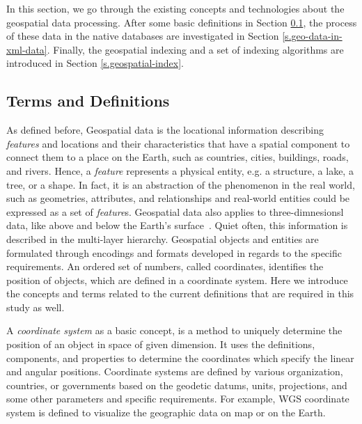\documentclass[a4paper,12pt]{article}
\begin{document}
In this section, we go through the existing concepts and technologies about the geospatial data processing. After some basic definitions in Section \ref{termsanddef}, the process of these data in the native databases are investigated in Section \ref{s.geo-data-in-xml-data}.
Finally, the geospatial indexing and a set of indexing algorithms are introduced in Section \ref{s.geospatial-index}.


\subsection{Terms and Definitions}
\label{termsanddef}
As defined before, Geospatial data is the locational information describing \textit{features} and locations and their characteristics that have a spatial component to connect them to a place on the Earth, such as countries, cities, buildings, roads, and rivers. Hence, a \textit{feature} represents a physical entity, e.g. a structure, a lake, a tree, or a shape. In fact, it is an abstraction of the phenomenon in the real world, such as geometries, attributes, and relationships and real-world entities could be expressed as a set of \textit{feature}s.
Geospatial data also applies to three-dimnesionsl data, like above and below the Earth's surface~\cite{powell}. Quiet often, this information is described in the multi-layer hierarchy. Geospatial objects and entities are formulated through encodings and formats developed in regards to the specific requirements. An ordered set of numbers, called coordinates, identifies the position of objects, which are defined in a coordinate system. Here we introduce the concepts and terms related to the current definitions that are required in this study as well.

A \emph{coordinate system} as a basic concept, is a method to uniquely determine the position of an object in space of given dimension. It uses the definitions, components, and properties to determine the coordinates which specify the linear and angular positions. Coordinate systems are defined by various organization, countries, or governments based on the geodetic datums, units, projections, and some other parameters and specific requirements. For example, WGS coordinate system is defined to visualize the geographic data on map or on the Earth. 
\end{document}
